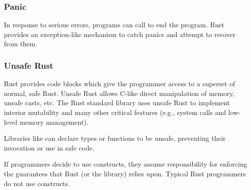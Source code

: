 \subsubsection{Panic}

In response to serious errors, programs can call\linebreak{} to end the
program.  Rust provides an exception-like mechanism to catch panics and attempt
to recover from them.

\subsubsection{Unsafe Rust}

Rust provides  code blocks which give the programmer access to a
superset of normal, safe Rust.  Unsafe Rust
allows C-like direct manipulation of memory, unsafe casts, etc.  The Rust
standard library uses unsafe Rust to implement interior mutability and many
other critical features (e.g., system calls and low-level memory management).

Libraries like \this{} can declare types or functions to be unsafe, preventing
their invocation or use in safe code.

If programmers decide to use  constructs, they
assume responsibility for enforcing the guarantees that Rust (or the library)
relies upon.  Typical Rust programmers do not use
 constructs.



